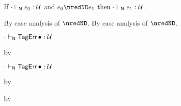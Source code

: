 \begin{lemma}\label{H-D-rr-preservation}
  If\/ ${\cdot} \vdash_{\mathsf{N}} e_0 : {\mathcal U}$
  and\/ $\sexpr_0 \nredND \sexpr_1$
  then\/ ${\cdot} \vdash_{\mathsf{N}} e_1 : {\mathcal U}$.
\end{lemma}{
  \newcommand{\shortpf}{By case analysis of $\nredND$.}
\begin{lamportproof*}
  \shortpf
\mainproof
  \shortpf

    \begin{pfproof}
      \qedstep
        \begin{pfproof}
          ${\cdot} \vdash_{\mathsf{N}} \mathsf{TagErr}\,{\bullet} : {\mathcal U}$
        \end{pfproof}
    \end{pfproof}

    \begin{pfproof}
      \qedstep
        \begin{pfproof}
          by 
        \end{pfproof}
    \end{pfproof}

    \begin{pfproof}
      \qedstep
        \begin{pfproof}
          ${\cdot} \vdash_{\mathsf{N}} \mathsf{TagErr}\,{\bullet} : {\mathcal U}$
        \end{pfproof}
    \end{pfproof}

    \begin{pfproof}
      \qedstep
        \begin{pfproof}
          by 
        \end{pfproof}
    \end{pfproof}

    \begin{pfproof}
      \qedstep
        \begin{pfproof}
          by 
        \end{pfproof}
    \end{pfproof}


\end{lamportproof*}}
